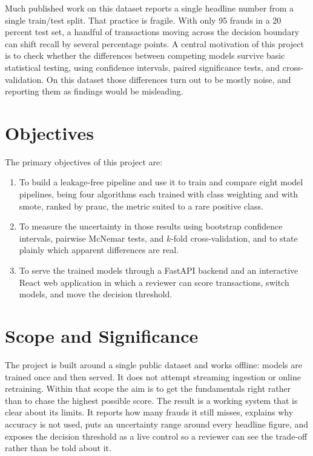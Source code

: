 Much published work on this dataset reports a single headline number from a single
train/test split. That practice is fragile. With only 95 frauds in a 20 percent test set,
a handful of transactions moving across the decision boundary can shift recall by several
percentage points. A central motivation of this project is to check whether the differences
between competing models survive basic statistical testing, using confidence intervals,
paired significance tests, and cross-validation. On this dataset those differences turn out
to be mostly noise, and reporting them as findings would be misleading.

\section{Objectives}

The primary objectives of this project are:

\begin{enumerate}
  \item To build a leakage-free pipeline and use it to train and compare eight model
        pipelines, being four algorithms each trained with class weighting and with
        \gls{smote}, ranked by \gls{prauc}, the metric suited to a rare positive class.
  \item To measure the uncertainty in those results using bootstrap confidence intervals,
        pairwise McNemar tests, and $k$-fold cross-validation, and to state plainly which
        apparent differences are real.
  \item To serve the trained models through a FastAPI backend and an interactive React web
        application in which a reviewer can score transactions, switch models, and move the
        decision threshold.
\end{enumerate}

\section{Scope and Significance}

The project is built around a single public dataset and works offline: models are trained
once and then served. It does not attempt streaming ingestion or online retraining. Within
that scope the aim is to get the fundamentals right rather than to chase the highest
possible score. The result is a working system that is clear about its limits. It reports
how many frauds it still misses, explains why accuracy is not used, puts an uncertainty
range around every headline figure, and exposes the decision threshold as a live control so
a reviewer can see the trade-off rather than be told about it.

